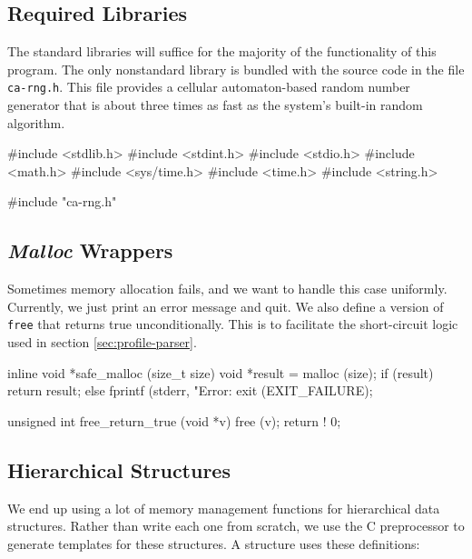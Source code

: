 \documentclass{article}
\begin{document}
    \subsection{Required Libraries}
      \label{sec:libraries}

      The standard libraries will suffice for the majority of the functionality
      of this program. The only nonstandard library is bundled with the source
      code in the file \verb|ca-rng.h|. This file provides a cellular
      automaton-based random number generator that is about three times as fast
      as the system's built-in random algorithm.

\begin{ccode}
#include <stdlib.h>
#include <stdint.h>
#include <stdio.h>
#include <math.h>
#include <sys/time.h>
#include <time.h>
#include <string.h>

#include "ca-rng.h"
\end{ccode}

    \subsection{{\em Malloc} Wrappers}
      \label{sec:malloc}

      Sometimes memory allocation fails, and we want to handle this case
      uniformly. Currently, we just print an error message and quit. We also
      define a version of \verb|free| that returns true unconditionally. This is
      to facilitate the short-circuit logic used in section
      \ref{sec:profile-parser}.

\begin{ccode}
inline void *safe_malloc (size_t size) {
  void *result = malloc (size);
  if (result)
    return result;
  else {
    fprintf (stderr, "Error: %
    exit (EXIT_FAILURE);
  }
}

unsigned int free_return_true (void *v) {
  free (v);
  return ! 0;
}
\end{ccode}

    \subsection{Hierarchical Structures}
      \label{sec:hierarchical}

      We end up using a lot of memory management functions for hierarchical data
      structures. Rather than write each one from scratch, we use the C
      preprocessor to generate templates for these structures. A structure uses
      these definitions:
\end{document}
